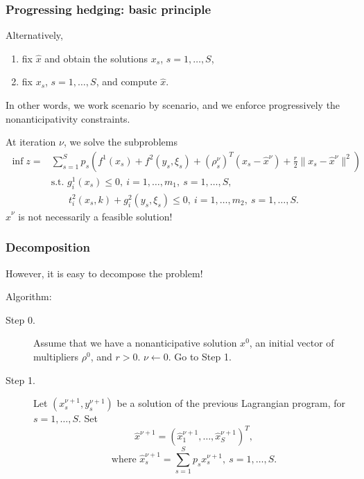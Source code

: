 \documentclass[french]{beamer}
\begin{document}
\begin{frame}
\frametitle{Progressing hedging: basic principle}

Alternatively,
\begin{enumerate}
\item
fix $\hat{x}$ and obtain the solutions $x_s$, $s = 1,\ldots,S$,
\item
fix $x_s$, $s = 1,\ldots,S$, and compute $\hat{x}$.
\end{enumerate}
In other words, we work scenario by scenario, and we enforce progressively the nonanticipativity constraints.

\mbox{}

At iteration $\nu$, we solve the subproblems
\begin{align*}
\inf z = & \sum_{s=1}^S p_s\left( f^1(x_s) + f^2\left(y_s,\xi_s\right) +
\left(\rho_s^{\nu}\right)^T\left(x_s-\hat{x}^{\nu}\right)+\frac{r}{2}\|
x_s-\hat{x}^{\nu} \|^2\right) \\
& \text{s.t. } g_i^1(x_s) \leq 0,\ i=1,\ldots{},m_1,\ s=1,\ldots{},S,\\
& \phantom{\text{t.q. }}
t_i^2\left(x_s,k\right)+g_i^2\left(y_s,\xi_s\right) \leq 0,\
i=1,\ldots{},m_2,\ s=1,\ldots{},S.
\end{align*}
$\hat{x}^{\nu}$ is not necessarily a feasible solution!

\end{frame}

\begin{frame}
\frametitle{Decomposition}

However, it is easy to decompose the problem!

Algorithm:
\begin{description}
\item[Step 0.]
Assume that we have a nonanticipative solution $x^0$, an initial vector of multipliers $\rho^0$, and $r > 0$.
  $\nu \leftarrow 0$. Go to Step 1.
\item[Step 1.]
Let $\left(x_s^{\nu+1}, y_s^{\nu+1}\right)$ be a solution of the previous Lagrangian program, for $s=1,\ldots{},S$. Set
\[
\hat{x}^{\nu+1} = \left( \hat{x}_1^{\nu+1}, \ldots{}, \hat{x}_S^{\nu+1}\right)^T,
\]
\[
\mbox{where } \hat{x}_s^{\nu+1} = \sum_{s=1}^S p_s x_s^{\nu+1},\ s=1,\ldots,S.
\]
\end{description}

\end{frame}
\end{document}
